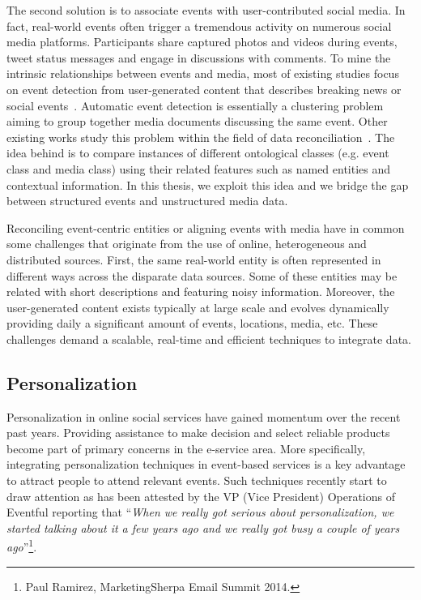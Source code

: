 The second solution is to associate events with user-contributed social media. In fact, real-world events often trigger a tremendous activity on numerous social media platforms. Participants share captured photos and videos during events, tweet status messages and engage in discussions with comments. To mine the intrinsic relationships between events and media, most of existing studies focus on event detection from user-generated content that describes breaking news or social events~\cite{Liu:2011,Becker:WebDB09,Sakaki:WWW10}. Automatic event detection is essentially a clustering problem aiming to group together media documents discussing the same event. Other existing works study this problem within the field of data reconciliation~\cite{Rowe:SWJ12,Xin:SIGMOD05}. The idea behind is to compare instances of different ontological classes (e.g. event class and media class) using their related features such as named entities and contextual information. In this thesis, we exploit this idea and we bridge the gap between structured events and unstructured media data. 

Reconciling event-centric entities or aligning events with media have in common some challenges that originate from the use of online, heterogeneous and distributed sources. First, the same real-world entity is often represented in different ways across the disparate data sources. Some of these entities may be related with short descriptions and featuring noisy information. Moreover, the user-generated content exists typically at large scale and evolves dynamically providing daily a significant amount of events, locations, media, etc. These challenges demand a scalable, real-time and efficient techniques to integrate data.

\subsection{Personalization}

Personalization in online social services have gained momentum over the recent past years. Providing assistance to make decision and select reliable products become part of primary concerns in the e-service area. More specifically, integrating personalization techniques in event-based services is a key advantage to attract people to attend relevant events. Such techniques recently start to draw attention as has been attested by the VP (Vice President) Operations of Eventful reporting that ``\textit{When we really got serious about personalization, we started talking about it a few years ago and we really got busy a couple of years ago}''\footnote{Paul Ramirez, MarketingSherpa Email Summit 2014.}.

